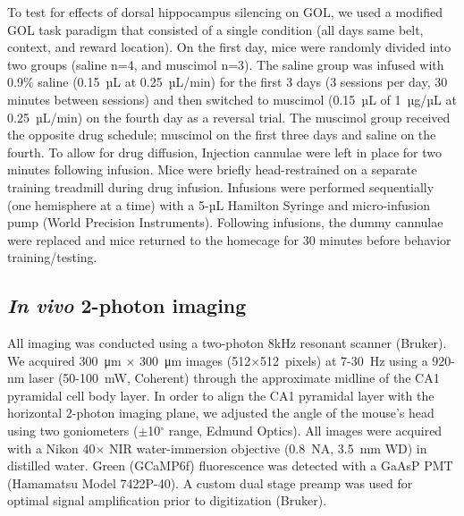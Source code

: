 To test for effects of dorsal hippocampus silencing on GOL, we used a modified GOL task paradigm that consisted of a single condition (all days same belt, context, and reward location). On the first day, mice were randomly divided into two groups (saline n=4, and muscimol n=3). The saline group was infused with 0.9\% saline (0.15~µL at 0.25~µL/min) for the first 3 days (3 sessions per day, 30 minutes between sessions) and then switched to muscimol (0.15~µL of 1~µg/µL at 0.25~µL/min) on the fourth day as a reversal trial. The muscimol group received the opposite drug schedule; muscimol on the first three days and saline on the fourth. To allow for drug diffusion, Injection cannulae were left in place for two minutes following infusion. Mice were briefly head-restrained on a separate training treadmill during drug infusion. Infusions were performed sequentially (one hemisphere at a time) with a 5-µL Hamilton Syringe and micro-infusion pump (World Precision Instruments). Following infusions, the dummy cannulae were replaced and mice returned to the homecage for 30 minutes before behavior training/testing.

\subsection{\emph{In vivo} 2-photon imaging}
All imaging was conducted using a two-photon 8kHz resonant scanner (Bruker). We acquired 300~μm $\times$ 300~μm images (512$\times$512~pixels) at 7-30~Hz using a 920-nm laser (50-100~mW, Coherent) through the approximate midline of the CA1 pyramidal cell body layer.  In order to align the CA1 pyramidal layer with the horizontal 2-photon imaging plane, we adjusted the angle of the mouse's head using two goniometers ($\pm$10$^{\circ}$ range, Edmund Optics).  All images were acquired with a Nikon 40$\times$ NIR water-immersion objective (0.8~NA, 3.5~mm WD) in distilled water. Green (GCaMP6f) fluorescence was detected with a GaAsP PMT (Hamamatsu Model 7422P-40). A custom dual stage preamp was used for optimal signal amplification prior to digitization (Bruker). 

